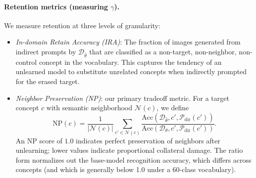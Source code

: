 \paragraph{Retention metrics (measuring $\gamma$).}
We measure retention at three levels of granularity:
\begin{itemize}
    \item \emph{In-domain Retain Accuracy (IRA)}: The fraction of images generated from indirect prompts by $\mathcal{D}_{\hat\theta}$ that are classified as a non-target, non-neighbor, non-control concept in the vocabulary. This captures the tendency of an unlearned model to substitute unrelated concepts when indirectly prompted for the erased target.
    \item \emph{Neighbor Preservation (NP)}: our primary tradeoff metric. For a target concept $c$ with semantic neighborhood $\mathcal{N}(c)$, we define
    \begin{equation}
    \label{eq:neighbor_pres}
    \mathrm{NP}(c) = \frac{1}{|\mathcal{N}(c)|} \sum_{c' \in \mathcal{N}(c)} \frac{\mathrm{Acc}(\mathcal{D}_{\hat\theta}, c', \mathcal{P}_{\mathrm{dir}}(c'))}
    {\mathrm{Acc}(\mathcal{D}_\theta, c', \mathcal{P}_{\mathrm{dir}}(c'))}.
    \end{equation}
    An NP score of $1.0$ indicates perfect preservation of neighbors after unlearning; lower values indicate proportional collateral damage. The ratio form normalizes out the base-model recognition accuracy, which differs across concepts (and which is generally below 1.0 under a 60-class vocabulary).

\end{itemize}
